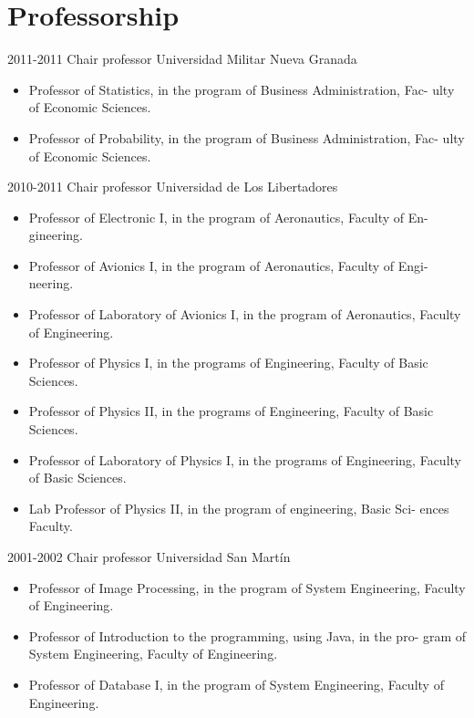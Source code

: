 \section{Professorship}

\begin{entrylist}
  \entry
	{2011-2011}
	{Chair professor}
	{Universidad Militar Nueva Granada}
	{\begin{itemize}
	    \item Professor of Statistics, in the program of Business Administration, Fac-
ulty of Economic Sciences.
            \item Professor of Probability, in the program of Business Administration, Fac-
	ulty of Economic Sciences.
	\end{itemize}}
  \entry
	{2010-2011}
	{Chair professor}
	{Universidad de Los Libertadores}
	{\begin{itemize}
              \item Professor of Electronic I, in the program of Aeronautics, Faculty of En-
gineering.
              \item Professor of Avionics I, in the program of Aeronautics, Faculty of Engi-
neering.
              \item Professor of Laboratory of Avionics I, in the program of Aeronautics,
Faculty of Engineering.
              \item Professor of Physics I, in the programs of Engineering, Faculty of Basic
Sciences.
              \item Professor of Physics II, in the programs of Engineering, Faculty of Basic
Sciences.
              \item Professor of Laboratory of Physics I, in the programs of Engineering,
Faculty of Basic Sciences.
              \item Lab Professor of Physics II, in the program of engineering, Basic Sci-
ences Faculty.
	\end{itemize}}
  \entry
        {2001-2002}
	{Chair professor}
	{Universidad San Martín}
	{\begin{itemize}
              \item Professor of Image Processing, in the program of System Engineering,
Faculty of Engineering.
              \item Professor of Introduction to the programming, using Java, in the pro-
gram of System Engineering, Faculty of Engineering.
              \item Professor of Database I, in the program of System Engineering, Faculty
of Engineering.
	\end{itemize}}
\end{entrylist}

